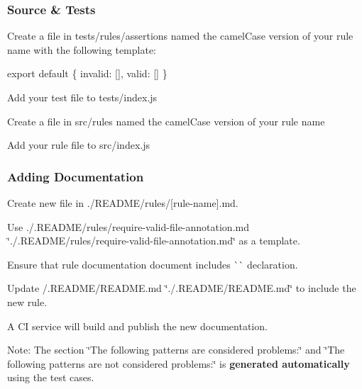 \subsubsection*{Source \& Tests}


\begin{DoxyEnumerate}
\item Create a file in {\ttfamily tests/rules/assertions} named the {\ttfamily camel\+Case} version of your rule name with the following template\+:
\begin{DoxyItemize}
\item {\ttfamily export default \{ invalid\+: \mbox{[}\mbox{]}, valid\+: \mbox{[}\mbox{]} \}}
\end{DoxyItemize}
\item Add your test file to {\ttfamily tests/index.\+js}
\item Create a file in {\ttfamily src/rules} named the {\ttfamily camel\+Case} version of your rule name
\item Add your rule file to {\ttfamily src/index.\+js}
\end{DoxyEnumerate}

\subsubsection*{Adding Documentation}


\begin{DoxyEnumerate}
\item Create new file in {\ttfamily ./\+R\+E\+A\+D\+M\+E/rules/\mbox{[}rule-\/name\mbox{]}.md}.
\begin{DoxyItemize}
\item Use ./.R\+E\+A\+D\+M\+E/rules/require-\/valid-\/file-\/annotation.\+md \char`\"{}./.\+R\+E\+A\+D\+M\+E/rules/require-\/valid-\/file-\/annotation.\+md\char`\"{} as a template.
\item Ensure that rule documentation document includes \`{}\`{} declaration.
\end{DoxyItemize}
\end{DoxyEnumerate}
\begin{DoxyEnumerate}
\item Update /.R\+E\+A\+D\+M\+E/\+R\+E\+A\+D\+M\+E.\+md \char`\"{}./.\+R\+E\+A\+D\+M\+E/\+R\+E\+A\+D\+M\+E.\+md\char`\"{} to include the new rule.
\end{DoxyEnumerate}

A CI service will build and publish the new documentation.

Note\+: The section \char`\"{}\+The following patterns are considered problems\+:\char`\"{} and \char`\"{}\+The following patterns are not considered problems\+:\char`\"{} is {\bfseries generated automatically} using the test cases. 